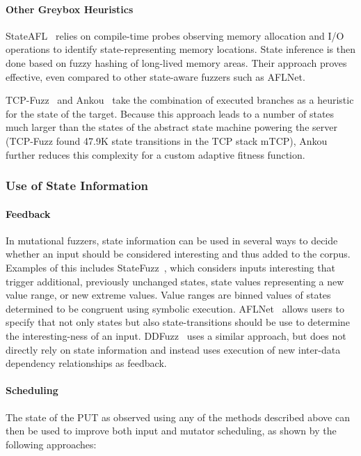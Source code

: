 \documentclass{article}
\let\savedCite=\cite
\renewcommand{\cite}{\unskip~\savedCite}
\begin{document}
\begin{multicols}{2}
  \paragraph{Other Greybox Heuristics}

  StateAFL\cite{StateAFL} relies on compile-time probes observing memory allocation and I/O operations to identify state-representing memory locations. State inference is then done based on fuzzy hashing of long-lived memory areas. Their approach proves effective, even compared to other state-aware fuzzers such as AFLNet.

  TCP-Fuzz\cite{TCPFuzz} and Ankou\cite{Ankou} take the combination of executed branches as a heuristic for the state of the target. Because this approach leads to a number of states much larger than the states of the abstract state machine powering the server (TCP-Fuzz found 47.9K state transitions in the TCP stack mTCP), Ankou further reduces this complexity for a custom adaptive fitness function.

  \subsubsection{Use of State Information}
  \paragraph{Feedback}

  In mutational fuzzers, state information can be used in several ways to decide whether an input should be considered interesting and thus added to the corpus. Examples of this includes StateFuzz\cite{StateFuzz}, which considers inputs interesting that trigger additional, previously unchanged states, state values representing a new value range, or new extreme values. Value ranges are binned values of states determined to be congruent using symbolic execution. AFLNet\cite{AFLNET} allows users to specify that not only states but also state-transitions should be use to determine the interesting-ness of an input. DDFuzz\cite{DDFuzz} uses a similar approach, but does not directly rely on state information and instead uses execution of new inter-data dependency relationships as feedback.

  \paragraph{Scheduling}

  The state of the PUT as observed using any of the methods described above can then be used to improve both input and mutator scheduling, as shown by the following approaches:


\end{multicols}
\end{document}
